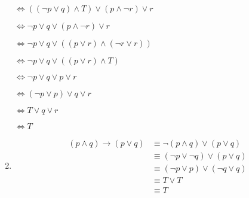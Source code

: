 \documentclass{../../cls/sig-alternate-05-2015}
\begin{document}
\begin{enumerate}
$\Leftrightarrow   ((\neg p\lor q) \land T )\lor ( p \land \neg r) \lor r$

$\Leftrightarrow   \neg p\lor q\lor (p \land \neg r) \lor r$

$\Leftrightarrow   \neg p\lor q\lor ((p \lor r)\land (\neg r\lor r)) $

$\Leftrightarrow   \neg p\lor q\lor (( p \lor r)\land T) $

$\Leftrightarrow   \neg p\lor q\lor p \lor r $

$\Leftrightarrow   (\neg p\lor p)\lor q \lor r $

$\Leftrightarrow   T\lor q \lor r $

$\Leftrightarrow   T $
\item 
\begin{align}
    (p \land q) \rightarrow (p \lor q)  & \equiv \neg (p \land q) \lor (p \lor q)\\
    & \equiv (\neg p \lor \neg q) \lor (p \lor q)\\
    & \equiv (\neg p \lor p) \lor (\neg q \lor q)\\
    & \equiv T \lor T\\
    & \equiv T
\end{align}
\end{enumerate}
\end{document}
